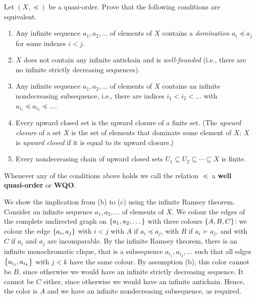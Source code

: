 \begin{exercise}
    Let $(X, \preceq)$ be a quasi-order.
    Prove that the following conditions are equivalent.
    \begin{enumerate}%
        \item[(a)] Any infinite sequence $a_1, a_2, \dots$ of elements of $X$
        contains a \emph{domination} $a_i \preceq a_j$
        for some indexes $i < j$.

        \item[(b)] $X$ does not contain any infinite antichain and is \emph{well-founded}
        (i.e., there are no infinite strictly decreasing sequences).

        \item[(c)] Any infinite sequence $a_1, a_2, \dots$ of elements of $X$
        contains an infinite nondecreasing subsequence, i.e., there are indices
        $i_1 < i_2 < \ldots$ with $a_{i_1} \preceq a_{i_2} \preceq \ldots$.

        \item[(d)] Every upward closed set is the upward closure of a finite set.
        (The \emph{upward closure} of a set $X$
        is the set of elements that dominate some element of $X$;
        $X$ is \emph{upward closed} if it is equal to its upward closure.)

        \item[(e)] Every nondecreasing chain of upward closed sets $U_1 \subseteq U_2 \subseteq \cdots \subseteq X$ is finite.
    \end{enumerate}
\end{exercise}
\noindent
Whenever any of the conditions above holds we call 
the relation $\preceq$ a \textbf{well quasi-order} or \textbf{WQO}.
%
\begin{solution}
    We show the implication from (b) to (c) using the infinite Ramsey theorem.
    Consider an infinite sequence $a_1, a_2, \dots$ of elements of $X$.
    We colour the edges of the complete undirected graph on $\left\{a_1, a_2, \dots\right\}$
    with three colours $\left\{A, B, C\right\}$: we colour the edge $\left\{a_i, a_j\right\}$ with $i < j$
    with $A$ if $a_i \preceq a_j$,
    with $B$ if $a_i \succ a_j$,
    and with $C$ if $a_i$ and $a_j$ are incomparable.
    By the infinite Ramsey theorem, there is an infinite monochromatic clique,
    that is a subsequence $a_{i_1}, a_{i_2}, \dots$ such that all edges $\left\{a_{i_j}, a_{i_k}\right\}$ with $j < k$ have the same colour.
    By assumption (b), this color cannot be $B$,
    since otherwise we would have an infinite strictly decreasing sequence.
    It cannot be $C$ either, since otherwise we would have an infinite antichain.
    Hence, the color is $A$ and we have an infinite nondecreasing subsequence, as required.
\end{solution}

